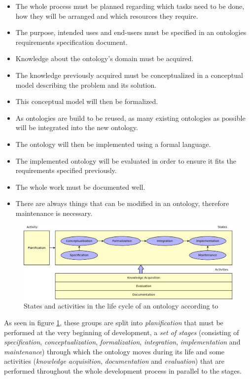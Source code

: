 \begin{itemize}
  \item The whole process must be planned regarding which tasks need to be done, how they will be arranged and which resources they require.
  \item The purpose, intended uses and end-users must be specified in an ontologies requirements specification document.
  \item Knowledge about the ontology's domain must be acquired.
  \item The knowledge previously acquired must be conceptualized in a conceptual model describing the problem and its solution.
  \item This conceptual model will then be formalized.
  \item As ontologies are build to be reused, as many existing ontologies as possible will be integrated into the new ontology.
  \item The ontology will then be implemented using a formal language.
  \item The implemented ontology will be evaluated in order to ensure it fits the requirements specified previously.
  \item The whole work must be documented well.
  \item There are always things that can be modified in an ontology, therefore maintenance is necessary.
\end{itemize}

\begin{figure}
  \includegraphics[width=\textwidth]{figures/ontology_lifecycle.png}
  \caption{States and activities in the life cycle of an ontology according to \methontology \cite{Methontology}}
  \label{fig:methontology1}
\end{figure}

As seen in figure \ref{fig:methontology1}, these groups are split into \emph{planification} that must be performed at the very beginning of development, a \emph{set of stages} (consisting of \emph{specification}, \emph{conceptualization}, \emph{formalization}, \emph{integration}, \emph{implementation} and \emph{maintenance}) through which the ontology moves during its life and some activities (\emph{knowledge acquisition}, \emph{documentation} and \emph{evaluation}) that are performed throughout the whole development process in parallel to the stages.

